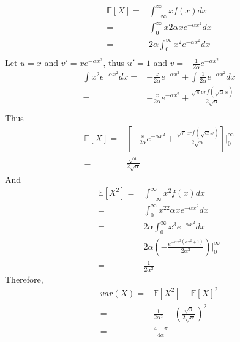 \documentclass{article}
\begin{document}
    \section{}
        \begin{equation*}
            \begin{split}
                \mathbb{E}[X]=&\int_{-\infty}^{\infty}xf(x)dx\\
                    =&\int_{0}^{\infty}x2\alpha xe^{-\alpha x^2}dx\\
                    =&2\alpha\int_{0}^{\infty} x^2e^{-\alpha x^2}dx\\
            \end{split}
        \end{equation*}
        Let $u=x$ and $v'=xe^{-\alpha x^2}$, thus $u'=1$ and $v=-\frac{1}{2\alpha}e^{-\alpha x^2}$
        \begin{equation*}
            \begin{split}
                \int x^2e^{-\alpha x^2}dx=&-\frac{x}{2\alpha}e^{-\alpha x^2}+\int \frac{1}{2\alpha}e^{-\alpha x^2}dx\\
                    =&-\frac{x}{2\alpha}e^{-\alpha x^2}+\frac{\sqrt{\pi}erf(\sqrt{\alpha}x)}{2\sqrt{\alpha}}\\
            \end{split}
        \end{equation*}
        Thus
        \begin{equation*}
            \begin{split}
                \mathbb{E}[X]=&[-\frac{x}{2\alpha}e^{-\alpha x^2}+\frac{\sqrt{\pi}erf(\sqrt{\alpha}x)}{2\sqrt{\alpha}}]|_0^{\infty}\\
                    =&\frac{\sqrt{\pi}}{2\sqrt{\alpha}}
            \end{split}
        \end{equation*}
        And 
        \begin{equation*}
            \begin{split}
                \mathbb{E}[X^2]=&\int_{-\infty}^{\infty}x^2f(x)dx\\
                    =&\int_{0}^{\infty}x^22\alpha xe^{-\alpha x^2}dx\\
                    =&2\alpha\int_{0}^{\infty}x^3e^{-\alpha x^2}dx\\
                    =&2\alpha(-\frac{e^{-\alpha x^2 (\alpha x^2+1)}}{2\alpha^2})|_0^\infty\\
                    =&\frac{1}{2\alpha^2}
            \end{split}
        \end{equation*}
        Therefore,
        \begin{equation*}
            \begin{split}
                var(X)=&\mathbb{E}[X^2]-\mathbb{E}[X]^2\\
                    =&\frac{1}{2\alpha^2}-(\frac{\sqrt{\pi}}{2\sqrt{\alpha}})^2\\
                    =&\frac{4-\pi}{4\alpha}
            \end{split}
        \end{equation*}
\end{document}
